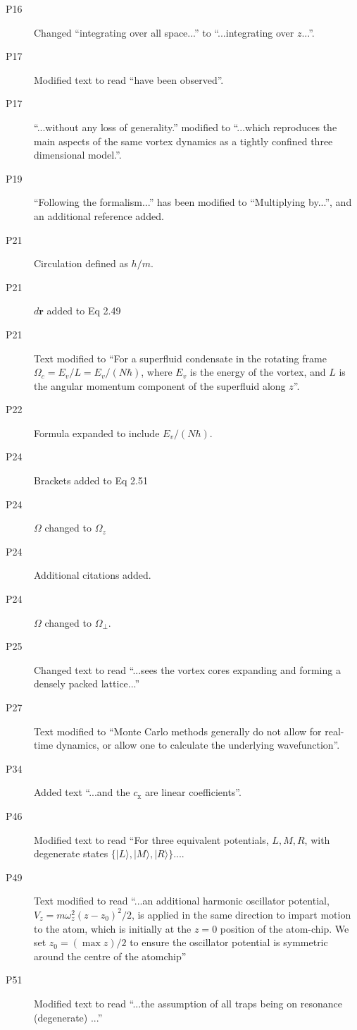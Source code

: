 \documentclass[paper=a4, fontsize=12pt]{scrartcl}
\begin{document}
\begin{description}
    \item [P16] Changed ``integrating over all space...'' to ``...integrating over $z$...''.
    \item [P17] Modified text to read ``have been observed''.
    \item [P17] ``...without any loss of generality.'' modified to ``...which reproduces the main aspects of the same vortex dynamics as a tightly confined three dimensional model.''.
    \item [P19] ``Following the formalism...'' has been modified to ``Multiplying by...'', and an additional reference added.
    \item [P21] Circulation defined as $h/m$.
    \item [P21] $d\mathbf{r}$ added to Eq 2.49
    \item [P21] Text modified to ``For a superfluid condensate in the rotating frame $\Omega_c = {E_v/L} = {E_v/(N\hbar)}$, where $E_v$ is the energy of the vortex, and $L$ is the angular momentum component of the superfluid along $z$''.
    \item [P22] Formula expanded to include $E_v/(N\hbar)$.
    \item [P24] Brackets added to Eq 2.51
    \item [P24] $\Omega$ changed to ${\Omega}_z$
    \item [P24] Additional citations added.
    \item [P24] $\Omega$ changed to $\Omega_\perp$.
    \item [P25] Changed text to read ``...sees the vortex cores expanding and forming a densely packed lattice...''
    \item [P27] Text modified to ``Monte Carlo methods generally do not allow for real-time dynamics, or allow one to calculate the underlying wavefunction''.
    \item [P34] Added text ``...and the $c_{\textrm{x}}$ are linear coefficients''.
    \item [P46] Modified text to read ``For three equivalent potentials, $L,M,R$, with degenerate states $\{|L \rangle,|M\rangle,|R\rangle\}...$.
    \item [P49] Text modified to read ``...an additional harmonic oscillator potential, $V_z = m\omega_z^2 (z-z_0)^2/2$, is applied in the same direction to impart motion to the atom, which is initially at the $z=0$ position of the atom-chip. We set $z_0 = (\max z)/2$ to ensure the oscillator potential is symmetric around the centre of the atomchip''
    \item [P51] Modified text to read ``...the assumption of all traps being on resonance (degenerate) ...''

\end{description}
\end{document}
